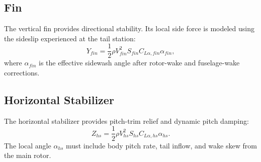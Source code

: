\documentclass[12pt,a4paper]{article}
\begin{document}
\subsection{Fin}

The vertical fin provides directional stability. Its local side force is modeled using the sideslip experienced at the tail station:
\begin{equation}
  Y_{fin} =
  \frac{1}{2}\rho V_{fin}^2 S_{fin} C_{L\alpha,fin}\alpha_{fin},
\end{equation}
where $\alpha_{fin}$ is the effective sidewash angle after rotor-wake and fuselage-wake corrections.

\subsection{Horizontal Stabilizer}

The horizontal stabilizer provides pitch-trim relief and dynamic pitch damping:
\begin{equation}
  Z_{hs} =
  \frac{1}{2}\rho V_{hs}^2 S_{hs} C_{L\alpha,hs}\alpha_{hs}.
\end{equation}
The local angle $\alpha_{hs}$ must include body pitch rate, tail inflow, and wake skew from the main rotor.
\end{document}

